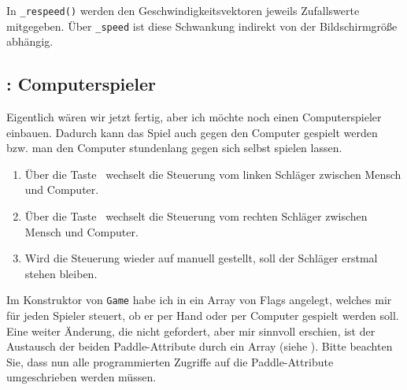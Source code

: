 
In \texttt{\_respeed()} werden den Geschwindigkeitsvektoren jeweils Zufallswerte mitgegeben. Über \texttt{\_speed} ist diese Schwankung indirekt von der Bildschirmgröße abhängig. 



\subsection{: Computerspieler}

Eigentlich wären wir jetzt fertig, aber ich möchte noch einen Computerspieler einbauen. Dadurch kann das Spiel auch gegen den Computer gespielt werden bzw. man den Computer stundenlang gegen sich selbst spielen lassen.

\begin{enumerate}
	\item Über die Taste~ wechselt die Steuerung vom linken Schläger zwischen Mensch und Computer.\label{req0201Computer1}

	\item Über die Taste~ wechselt die Steuerung vom rechten Schläger zwischen Mensch und Computer.\label{req0201Computer2}
	
	\item Wird die Steuerung wieder auf manuell gestellt, soll der Schläger erstmal stehen bleiben.\label{req0201ComputerHalt}
\end{enumerate}
\er

Im Konstruktor von \texttt{Game} habe ich in  ein Array von Flags angelegt, welches mir für jeden Spieler steuert, ob er per Hand oder per Computer gespielt werden soll. Eine weiter Änderung, die nicht gefordert, aber mir sinnvoll erschien, ist der Austausch der beiden Paddle-Attribute durch ein Array (siehe ). Bitte beachten Sie, dass nun alle programmierten Zugriffe auf die Paddle-Attribute umgeschrieben werden müssen.


